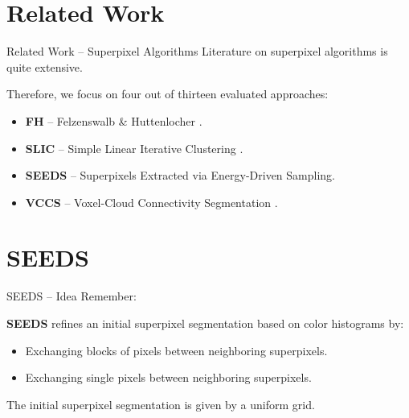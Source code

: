 \documentclass[handout]{beamer}
\begin{document}
	\section{Related Work}
	\begin{frame}{Related Work -- Superpixel Algorithms}
		Literature on superpixel algorithms is quite extensive.
		\vskip 0.5cm
		
		Therefore, we focus on four out of thirteen evaluated approaches:
		\vskip 0.25cm
		\begin{itemize}[leftmargin=0cm]
			\item \textbf{FH} -- Felzenswalb \& Huttenlocher \cite{FelzenswalbHuttenlocher:2004}.
			\pause
			
			\item \textbf{SLIC} -- Simple Linear Iterative Clustering \cite{AchantaShajiSmithLucchiFuaSuesstrunk:2010}.
			\pause
			
			\item \textbf{SEEDS} -- Superpixels Extracted via Energy-Driven Sampling.
			\pause
			
			\item \textbf{VCCS} -- Voxel-Cloud Connectivity Segmentation \cite{PaponAbramovSchoelerWoergoetter:2013}.
		\end{itemize}
	\end{frame}
	
	\section{SEEDS}
	\begin{frame}{SEEDS -- Idea}
		Remember:
		\vskip 0.25cm
	
		\textbf{SEEDS} refines an initial superpixel segmentation based on color histograms by:
		\vskip 0.25cm
		\begin{itemize}[label=--]
			\item Exchanging blocks of pixels between neighboring superpixels.
			\item Exchanging single pixels between neighboring superpixels.
		\end{itemize}
		\vskip 0.25cm
		
		The initial superpixel segmentation is given by a uniform grid.
	\end{frame}

\end{document}
